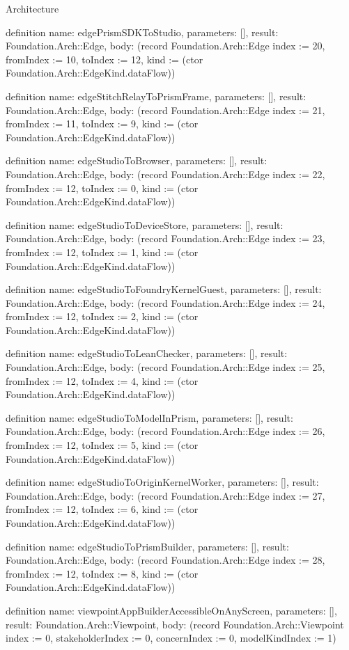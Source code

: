 \begin{lexlean}{Architecture}
\begin{semanticmodule}
definition{
  name: edgePrismSDKToStudio,
  parameters: [],
  result: Foundation.Arch::Edge,
  body: (record Foundation.Arch::Edge {index := 20, fromIndex := 10, toIndex := 12, kind := (ctor Foundation.Arch::EdgeKind.dataFlow)})
}

definition{
  name: edgeStitchRelayToPrismFrame,
  parameters: [],
  result: Foundation.Arch::Edge,
  body: (record Foundation.Arch::Edge {index := 21, fromIndex := 11, toIndex := 9, kind := (ctor Foundation.Arch::EdgeKind.dataFlow)})
}

definition{
  name: edgeStudioToBrowser,
  parameters: [],
  result: Foundation.Arch::Edge,
  body: (record Foundation.Arch::Edge {index := 22, fromIndex := 12, toIndex := 0, kind := (ctor Foundation.Arch::EdgeKind.dataFlow)})
}

definition{
  name: edgeStudioToDeviceStore,
  parameters: [],
  result: Foundation.Arch::Edge,
  body: (record Foundation.Arch::Edge {index := 23, fromIndex := 12, toIndex := 1, kind := (ctor Foundation.Arch::EdgeKind.dataFlow)})
}

definition{
  name: edgeStudioToFoundryKernelGuest,
  parameters: [],
  result: Foundation.Arch::Edge,
  body: (record Foundation.Arch::Edge {index := 24, fromIndex := 12, toIndex := 2, kind := (ctor Foundation.Arch::EdgeKind.dataFlow)})
}

definition{
  name: edgeStudioToLeanChecker,
  parameters: [],
  result: Foundation.Arch::Edge,
  body: (record Foundation.Arch::Edge {index := 25, fromIndex := 12, toIndex := 4, kind := (ctor Foundation.Arch::EdgeKind.dataFlow)})
}

definition{
  name: edgeStudioToModelInPrism,
  parameters: [],
  result: Foundation.Arch::Edge,
  body: (record Foundation.Arch::Edge {index := 26, fromIndex := 12, toIndex := 5, kind := (ctor Foundation.Arch::EdgeKind.dataFlow)})
}

definition{
  name: edgeStudioToOriginKernelWorker,
  parameters: [],
  result: Foundation.Arch::Edge,
  body: (record Foundation.Arch::Edge {index := 27, fromIndex := 12, toIndex := 6, kind := (ctor Foundation.Arch::EdgeKind.dataFlow)})
}

definition{
  name: edgeStudioToPrismBuilder,
  parameters: [],
  result: Foundation.Arch::Edge,
  body: (record Foundation.Arch::Edge {index := 28, fromIndex := 12, toIndex := 8, kind := (ctor Foundation.Arch::EdgeKind.dataFlow)})
}

definition{
  name: viewpointAppBuilderAccessibleOnAnyScreen,
  parameters: [],
  result: Foundation.Arch::Viewpoint,
  body: (record Foundation.Arch::Viewpoint {index := 0, stakeholderIndex := 0, concernIndex := 0, modelKindIndex := 1})
}


\end{semanticmodule}
\end{lexlean}
